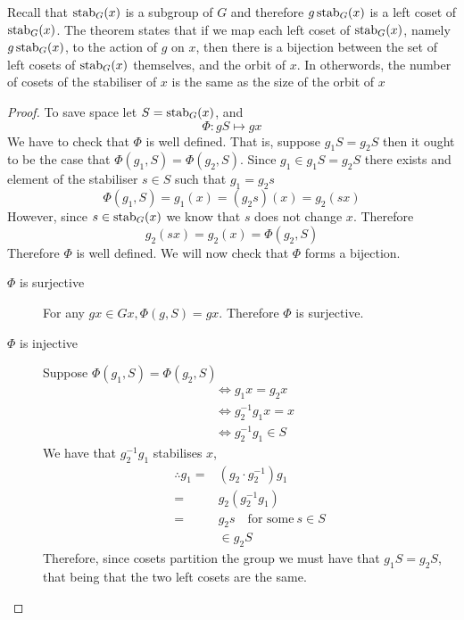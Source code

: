 \documentclass{article}
\begin{document}
Recall that $\operatorname{stab}_G(x)$ is a subgroup of $G$ and therefore $g \operatorname{stab}_G(x)$ is a left coset of $\operatorname{stab}_G(x)$. 
The theorem states that if we map each left coset of $\operatorname{stab}_G(x)$, namely $g\operatorname{stab}_G(x)$, to the action of $g$ on $x$, then there is a bijection between the set of left cosets of $\operatorname{stab}_G(x)$ themselves, and the orbit of $x$.
In otherwords, the number of cosets of the stabiliser of $x$ is the same as the size of the orbit of $x$

\begin{proof}
    To save space let $S = \operatorname{stab}_G(x)$, and 
    \[
        \Phi: gS \mapsto gx
    \]
    We have to check that $\Phi$ is well defined. That is, suppose $g_1S = g_2S$ then it ought to be the case that $\Phi(g_1, S) = \Phi(g_2, S)$.
    Since $g_1 \in g_1S = g_2S$ there exists and element of the stabiliser $s \in S$ such that $g_1 = g_2s$
    \[
        \Phi(g_1, S) = g_1(x) = (g_2 s)(x) = g_2 (sx)
    \]
    However, since $s \in \operatorname{stab}_G(x)$ we know that $s$ does not change $x$. Therefore
    \[
        g_2 (sx) = g_2(x) = \Phi(g_2, S)
    \]
    Therefore $\Phi$ is well defined. We will now check that $\Phi$ forms a bijection.

    \begin{description}
        \item[$\Phi$ is surjective] For any $gx \in Gx, \Phi(g, S) = gx$. Therefore $\Phi$ is surjective.
        \item[$\Phi$ is injective] Suppose $\Phi(g_1, S) = \Phi(g_2, S)$
        \begin{align*}
            &\Leftrightarrow g_1x = g_2x \\
            &\Leftrightarrow g_2^{-1}g_1x = x \\
            &\Leftrightarrow g_2^{-1}g_1 \in S
        \end{align*}
        We have that $g_2^{-1}g_1$ stabilises $x$, 
        \begin{align*}
            \therefore g_1 =& (g_2 \cdot g_2^{-1}) g_1 \\
            =& g_2 (g_2^{-1}g_1) \\
            =& g_2 s \quad \text{for some} \ s \in S\\
            &\in g_2 S
        \end{align*}
        Therefore, since cosets partition the group we must have that $g_1S = g_2S$, that being that the two left cosets are the same.
    \end{description}
\end{proof}
\end{document}
